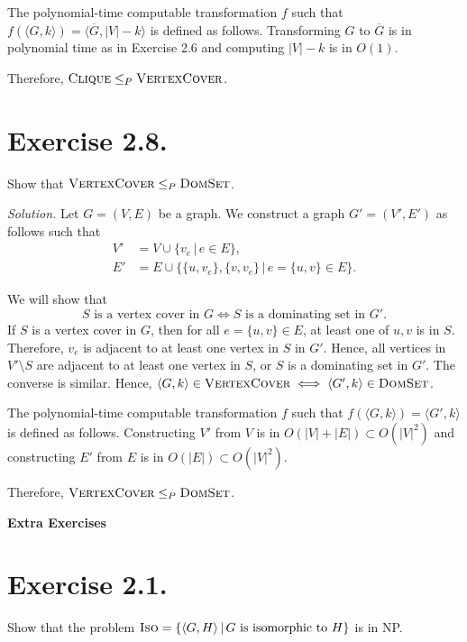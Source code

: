 The polynomial-time computable transformation $f$ such that $f(\langle G,k\rangle) = \langle \overline{G}, |V|-k\rangle$ is defined as follows. Transforming $G$ to $\overline{G}$ is in polynomial time as in Exercise 2.6 and computing $|V|-k$ is in $O(1)$.

Therefore, $\textsc{Clique}\le_P\textsc{VertexCover}$.

\section{Exercise 2.8.} Show that $\textsc{VertexCover}\le_P\textsc{DomSet}$.

\textit{Solution.} Let $G = (V,E)$ be a graph. We construct a graph $G' = (V',E')$ as follows such that
\begin{align*}
  V' & = V \cup \{v_e \,|\, e \in E\},                            \\
  E' & = E \cup \{\{u,v_e\}, \{v,v_e\} \,|\, e = \{u,v\} \in E\}.
\end{align*}

We will show that
$$S \text{ is a vertex cover in } G \iff S \text{ is a dominating set in }  G'.$$
If $S$ is a vertex cover in $G$, then for all $e = \{u,v\} \in E$, at least one of $u,v$ is in $S$. Therefore, $v_e$ is adjacent to at least one vertex in $S$ in $G'$. Hence, all vertices in $V'\setminus S$ are adjacent to at least one vertex in $S$, or $S$ is a dominating set in $G'$. The converse is similar. Hence, $\langle G,k\rangle \in \textsc{VertexCover} \iff \langle G', k\rangle \in \textsc{DomSet}$.

The polynomial-time computable transformation $f$ such that $f(\langle G,k\rangle) = \langle G', k\rangle$ is defined as follows. Constructing $V'$ from $V$ is in $O(|V| + |E|)\subset O(|V|^2)$ and constructing $E'$ from $E$ is in $O(|E|)\subset O(|V|^2)$.

Therefore, $\textsc{VertexCover}\le_P\textsc{DomSet}$.

\newpage

\begin{center}
  {\bf
    \vspace{0.9cm}
    Extra Exercises
  }
\end{center}

\section{Exercise 2.1.} Show that the problem $\textsc{Iso} = \{\langle G, H\rangle \,|\, G \text{ is isomorphic to } H\}$ is in NP.

